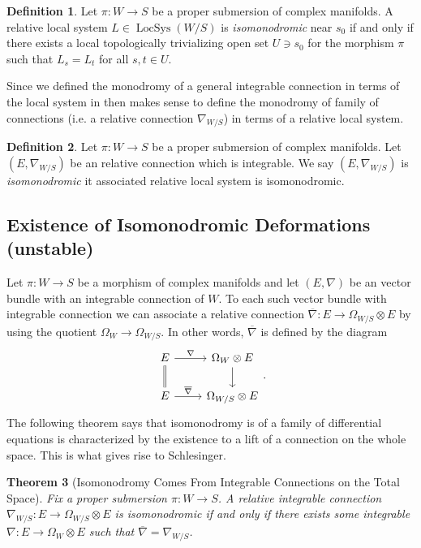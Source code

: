 \documentclass[12pt]{book}
\numberwithin{equation}{section}
\newtheorem{theorem}{Theorem}[subsection]
\theoremstyle{definition}
\newtheorem{definition}[theorem]{Definition}
\theoremstyle{remark}
\newcommand{\LocSys}{\operatorname{LocSys}}
\begin{document}
\begin{definition}
	Let $\pi: W\to S$ be a proper submersion of complex manifolds. 
	A relative local system $L \in \LocSys(W/S)$ is \emph{isomonodromic} near $s_0$ if and only if there exists a local topologically trivializing open set $U\owns s_0$ for the morphism $\pi$ such that $L_s = L_t$ for all $s,t\in U$. 
\end{definition}

Since we defined the monodromy of a general integrable connection in terms of the local system in then makes sense to define the monodromy of family of connections (i.e. a relative connection $\nabla_{W/S}$) in terms of a relative local system. 
\begin{definition}
	Let $\pi:W \to S$ be a proper submersion of complex manifolds. 
	Let $(E,\nabla_{W/S})$ be an relative connection which is integrable. 
	We say $(E,\nabla_{W/S})$ is \emph{isomonodromic} it associated relative local system is isomonodromic.
\end{definition}


\subsection{Existence of Isomonodromic Deformations (unstable)}
Let $\pi: W\to S$ be a morphism of complex manifolds and let $(E,\nabla)$ be an vector bundle with an integrable connection of $W$.
To each such vector bundle with integrable connection we can associate a relative connection $\overline{\nabla}\colon E \to \Omega_{W/S} \otimes E$ by using the quotient $\Omega_{W} \to \Omega_{W/S}$. 
In other words, $\overline{\nabla}$ is defined by the diagram 
$$\begin{tikzcd}
E \ar[r, "\nabla"] \ar[d, equal] & \Omega_{W} \otimes E\ar[d] \\
E \ar[r,"\overline{\nabla}"] &  \Omega_{W/S}\otimes E
\end{tikzcd}.$$
The following theorem says that isomonodromy is of a family of differential equations is characterized by the existence to a lift of a connection on the whole space. 
This is what gives rise to Schlesinger. 
\begin{theorem}[Isomonodromy Comes From Integrable Connections on the Total Space]
	Fix a proper submersion $\pi: W\to S$. 
	A relative integrable connection $\nabla_{W/S}: E\to \Omega_{W/S}\otimes E$ is isomonodromic if and only if there exists some integrable $\nabla: E\to \Omega_W \otimes E$ such that $\overline{\nabla} = \nabla_{W/S}$.
\end{theorem}
\end{document}
